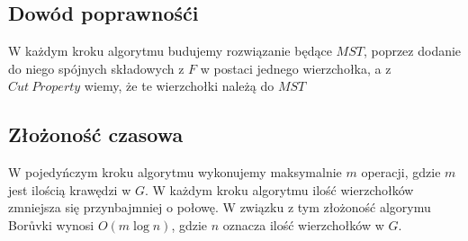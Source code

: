 \subsection{Dowód poprawnośći}
W każdym kroku algorytmu budujemy rozwiązanie będące $MST$, poprzez dodanie do niego spójnych składowych z $F$ w postaci jednego wierzchołka, a z
$Cut\ Property$ wiemy, że te wierzchołki należą do $MST$

\subsection{Złożoność czasowa}
W pojedyńczym kroku algorytmu wykonujemy maksymalnie $m$ operacji, gdzie $m$ jest ilością krawędzi w $G$.
W każdym kroku algorytmu ilość wierzchołków zmniejsza się przynbajmniej o połowę.
W związku z tym złożoność algorymu Borůvki wynosi $O(m\log{}n)$, gdzie $n$ oznacza ilość wierzchołków w $G$.
